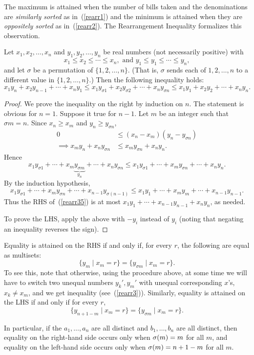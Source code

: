 The maximum is attained when the number of bills taken and the denominations are {\it similarly sorted} as in~(\ref{rearr1}) and the minimum is attained when they are {\it oppositely sorted} as in~(\ref{rearr2}). The Rearrangement Inequality formalizes this observation.
\begin{thm}[Rearrangement]
Let $x_1,x_2,\ldots,x_n$ and $y_1,y_2,\ldots,y_n$ be real numbers (not
necessarily positive) with \[x_1\leq x_2\leq\cdots\leq x_n,\textrm{ and }y_1\leq
y_1\leq\cdots\leq y_n,\] and let $\sigma$ be a permutation
of $\{1,2,\ldots,n\}$. (That is, $\sigma$ sends each of $1,2,\ldots, n$ to a different value in $\{1,2,\ldots,n\}$.) Then the following inequality holds:
\[x_1y_n+x_2y_{n-1}+\cdots+x_ny_1\leq x_1y_{\sigma 1}+x_2y_{\sigma
2}+\cdots+x_ny_{\sigma n}\leq x_1y_1+x_2y_2+\cdots+x_ny_n.\]
\end{thm}
\begin{proof}
We prove the inequality on the right by induction on $n$. The statement is obvious for $n=1$. Suppose it true for $n-1$. Let $m$ be an integer such that $\sigma m=n$. Since $x_n\geq x_m$ and $y_{n}\geq y_{\sigma n}$,
\begin{align}
0&\leq (x_n-x_m)(y_n-y_{\sigma n})\label{rearr3}
\\
\nonumber 
\implies x_{m}y_n+x_ny_{\sigma n}&\leq x_my_{\sigma n}+x_ny_n.
\end{align}
Hence
\begin{equation}\label{rearr35}
x_1y_{\sigma 1}+\cdots +x_m\underbrace{y_{\sigma
m}}_{y_n}+\cdots+x_ny_{\sigma n}\leq x_1y_{\sigma 1}+\cdots +x_my_{\sigma n}+\cdots+x_ny_n.
\end{equation}
By the induction hypothesis,
\[
x_1y_{\sigma 1}+\cdots +x_my_{\sigma
n}+\cdots+x_{n-1}y_{\sigma (n-1)}\leq x_1y_{1}+\cdots +x_my_{m}+ \cdots +x_{n-1}y_{n-1}.
\]
Thus the RHS of~(\ref{rearr35}) is at most $x_1y_1+\cdots +x_{n-1}y_{n-1}+x_ny_n$, as needed.

To prove the LHS, apply the above with $-y_i$ instead of $y_i$ (noting that negating an inequality reverses the sign).
\end{proof}
\begin{rem}
Equality is attained on the RHS if and only if, for every $r$, the following are equal as multisets:
\[
\{y_m\mid x_m=r\}=\{y_{\sigma m}\mid x_m=r\}.
\]
To see this, note that otherwise, using the procedure above, at some time we will have to switch two unequal numbers $y_k',y_m'$ with unequal corresponding $x$'s, $x_k\ne x_m$, and we get inequality (see~(\ref{rearr3})). Similarly, equality is attained on the LHS if and only if for every $r$,
\[
\{y_{n+1-m}\mid x_m=r\}=\{y_{\sigma m}\mid x_m=r\}.
\]

In particular, if the $a_1,\ldots, a_n$ are all distinct and $b_1,\ldots, b_n$ are all distinct, then equality on the right-hand side occurs only when $\sigma(m)=m$ for all $m$, and equality on the left-hand side occurs only when $\sigma(m)=n+1-m$ for all $m$.
\end{rem}

